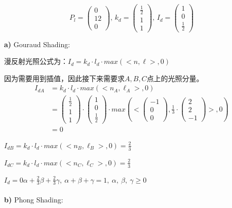\documentclass[fleqn]{article}
\begin{document}
$$P_l=\begin{pmatrix}
    0\\12\\0
\end{pmatrix},\,k_d=\begin{pmatrix}
    \frac{1}{2}\\1\\1
\end{pmatrix},\,I_d=\begin{pmatrix}
    1\\0\\\frac{1}{2}
\end{pmatrix}$$

\noindent\textbf{a)} Gouraud Shading:

漫反射光照公式为：$I_d = k_d \cdot l_d \cdot max(<n, \ell  >,0)$

因为需要用到插值，因此接下来需要求$A,B,C$点上的光照分量。
\begin{equation}
    \begin{split}
            I_{dA} & = k_d \cdot l_d \cdot max(<n_A,\ell _A>,0)\\
    &= \begin{pmatrix}\frac{1}{2} \\ 1 \\ 1 \end{pmatrix} \cdot \begin{pmatrix} 1 \\ 0 \\ \frac{1}{2} \end{pmatrix} \cdot max(<\begin{pmatrix} -1 \\ 0 \\ 0 \end{pmatrix},\frac{1}{3}\cdot \begin{pmatrix} 2\\ 2 \\ -1 \end{pmatrix}>,0) \\
        &=0
    \end{split}
\end{equation}

\qquad $I_{dB} = k_d\cdot l_d\cdot max(<n_B,\ell _B>,0) = \frac{2}{3}$

\qquad $I_{dC} = k_d\cdot l_d\cdot max(<n_C,\ell _C>,0) = \frac{2}{3}$

\qquad $I_d = 0\alpha  + \frac{2}{3}\beta + \frac{2}{3}\gamma,\ \alpha + \beta+\gamma = 1,\ \alpha ,\ \beta,\ \gamma \geq 0$
\\
\\
\noindent\textbf{b)} Phong Shading:
\end{document}
